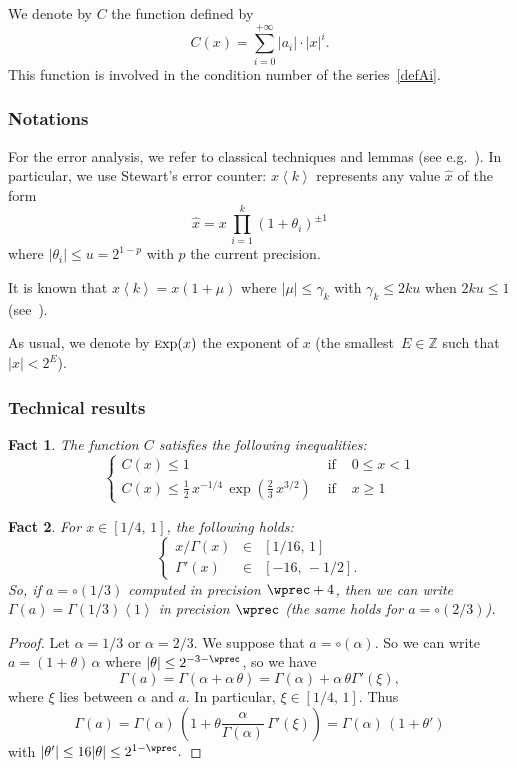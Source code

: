 \documentclass[12pt]{amsart}
\def\Exp{{\rm \textsc exp}}
\newcommand{\rnd}[1]{\left\langle#1\right\rangle}
\newtheorem{fact}{Fact}
\begin{document}
We denote by $C$ the function defined by
      $$ C(x) =  \sum_{i=0}^{+\infty} |a_i| \cdot |x|^i.$$
This function is involved in the condition number of the series~\eqref{defAi}.

\subsubsection{Notations}
For the error analysis, we refer to classical techniques and lemmas (see e.g.~\cite{Higham02}). In particular, we use Stewart's error counter: $x\rnd{k}$ represents any value $\widehat{x}$ of the form $$\widehat{x} = x\,\prod_{i=1}^k (1+\theta_i)^{\pm 1}$$  where $|\theta_i| \le u = 2^{1-p}$ with $p$ the current precision.

It is known that $x\rnd{k} =x(1+\mu)$ where $|\mu| \le \gamma_k$ with $\gamma_k \le 2ku$ when $2ku \le 1$ (see~\cite{Higham02}).

As usual, we denote by $\Exp(x)$ the exponent of $x$ (the smallest~$E \in \mathbb{Z}$ such that~$|x| < 2^E$).

\subsubsection{Technical results}
\begin{fact}
\label{conditionNumberOfAi}
  The function $C$ satisfies the following inequalities:
  \begin{equation}
    \label{majoreCond}
    \left\{\begin{array}{ccl} 
        C(x) \le 1 & \text{ if } & 0 \le x < 1\\
        C(x) \le \frac{1}{2}\,x^{-1/4}\,\exp\left(\frac{2}{3}\,x^{3/2}\right) & \text{ if } & x \ge 1
      \end{array}
      \right.
  \end{equation}
\end{fact}

\begin{fact}
For $x \in [1/4,\,1]$, the following holds: 
  $$\left\{\begin{array}{rcl}
      x/\Gamma(x) &\in& [1/16,\,1]\\
      \Gamma'(x) &\in& [-16,\,-1/2].
    \end{array}
  \right.
  $$
So, if $a = \circ(1/3)$ computed in precision $\wprec+4$, then we can write $\Gamma(a) = \Gamma(1/3)\rnd{1}$ in precision $\wprec$ (the same holds for $a = \circ(2/3)$).
\end{fact}
\begin{proof}
Let $\alpha = 1/3$ or $\alpha = 2/3$. We suppose that $a = \circ(\alpha)$. So we can write $a = (1+\theta)\,\alpha$ where $|\theta|\le 2^{-3-\wprec}$, so we have
$$ \Gamma(a) = \Gamma(\alpha + \alpha\,\theta) = \Gamma(\alpha) + \alpha\,\theta\Gamma'(\xi),$$%
where $\xi$ lies between $\alpha$ and $a$. In particular, $\xi \in [1/4,\,1]$. Thus $$\Gamma(a) = \Gamma(\alpha)\,\left(1 + \theta\frac{\alpha}{\Gamma(\alpha)}\,\Gamma'(\xi)\right) = \Gamma(\alpha)\,(1+\theta')$$ with $|\theta'| \le 16|\theta| \le 2^{1-\wprec}.$  
\end{proof}
\end{document}
